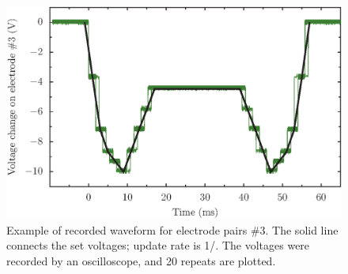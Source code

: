 \begin{figure}[h!t]
\centering
\includegraphics{chapter7/waveform/rtusual/recordedwaveform_v1}
\caption[Example of recorded waveform for ion shuttle]{Example of recorded waveform for electrode pairs \#3. The solid line connects the set voltages; update rate is 1/\ms. The voltages were recorded by an oscilloscope, and 20 repeats are plotted.}
\label{fig:rtscopewaveform}
\end{figure} 

% 
